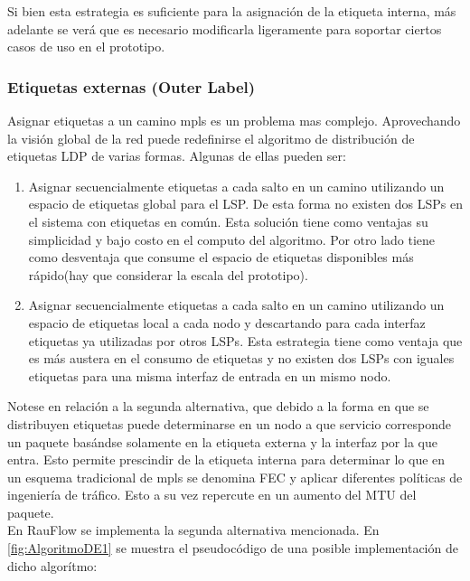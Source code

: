 Si bien esta estrategia es suficiente para la asignación de la etiqueta interna, m\'as adelante se ver\'a que es necesario modificarla ligeramente para soportar ciertos casos de uso en el prototipo.

\subsubsection{Etiquetas externas (Outer Label)}
Asignar etiquetas a un camino mpls es un problema mas complejo. Aprovechando la visión global de la red puede redefinirse el algoritmo de distribución de etiquetas LDP de varias formas. Algunas de ellas pueden ser:

\begin{enumerate}
\item Asignar secuencialmente etiquetas a cada salto en un camino utilizando un espacio de etiquetas global para el LSP. De esta forma no existen dos LSPs en el sistema con etiquetas en com\'un. Esta solución tiene como ventajas su simplicidad y bajo costo en el computo del algoritmo. Por otro lado tiene como desventaja que consume el espacio de etiquetas disponibles m\'as r\'apido(hay que considerar la escala del prototipo).

\item Asignar secuencialmente etiquetas a cada salto en un camino utilizando un espacio de etiquetas local a cada nodo y descartando para cada interfaz etiquetas ya utilizadas por otros LSPs. Esta estrategia tiene como ventaja que es m\'as austera en el consumo de etiquetas y no existen dos LSPs con iguales etiquetas para una misma interfaz de entrada en un mismo nodo.
\end{enumerate}

Notese en relación a la segunda alternativa, que debido a la forma en que se distribuyen etiquetas puede determinarse en un nodo a que servicio corresponde un paquete bas\'andse solamente en la etiqueta externa y la interfaz por la que entra. Esto permite prescindir de la etiqueta interna para determinar lo que en un esquema tradicional de mpls se denomina FEC y aplicar diferentes pol\'iticas de ingenier\'ia de tr\'afico. Esto a su vez repercute en un aumento del MTU del paquete.\\ 

En RauFlow se implementa la segunda alternativa mencionada. En \ref{fig:AlgoritmoDE1} se muestra el pseudoc\'odigo de una posible implementaci\'on de dicho algor\'itmo:\\

